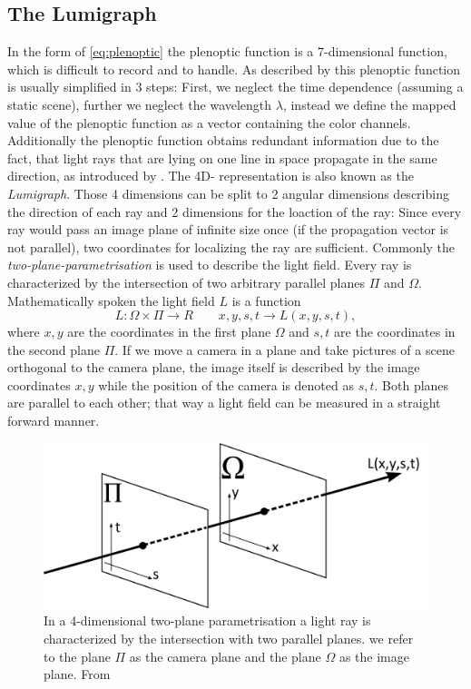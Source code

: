 \documentclass  [
  paper    = a4,
  BCOR     = 10mm,
  twoside,
  fontsize = 12pt,
  fleqn,
  toc      = bibnumbered,
  toc      = listofnumbered,
  numbers  = noendperiod,
  headings = normal,
  listof   = leveldown,
  version  = 3.03
]                                       {scrreprt}
\begin{document}
\subsection{The Lumigraph}
In the form of \ref{eq:plenoptic} the plenoptic function is a 7-dimensional function, which is difficult to record and to handle. As described by \cite{wu2017light} this plenoptic function is usually simplified in 3 steps: First, we neglect the time dependence (assuming a static scene), further we neglect the wavelength $\lambda$, instead we define the mapped value of the plenoptic function as a vector containing the color channels. 
Additionally the plenoptic function obtains redundant information due to the fact, that light rays that are lying on one line in space propagate in the same direction, as introduced by \cite{bolles1987epipolar}. The 4D- representation is also known as the \textit{Lumigraph}. Those 4 dimensions can be split to 2 angular dimensions describing the direction of each ray and 2 dimensions for the loaction of the ray: Since every ray would pass an image plane of infinite size once (if the propagation vector is not parallel), two coordinates for localizing the ray are sufficient. Commonly the \textit{two-plane-parametrisation} is used to describe the light field. Every ray is characterized by the intersection of two arbitrary parallel planes $\Pi$ and $\Omega$. Mathematically spoken the light field $L$ is a function
\begin{equation}\label{key}
L:\Omega\times \Pi \rightarrow \!R\qquad x,y,s,t\rightarrow L(x,y,s,t),
\end{equation}
where $x,y$ are the coordinates in the first plane $\Omega$ and $s,t$ are the coordinates in the second plane $\Pi$. If we move a camera in a plane and take pictures of a scene orthogonal to the camera plane, the image itself is described by the image coordinates $x,y$ while the position of the camera is denoted as $s,t$. Both planes are parallel to each other; that way a light field can be measured in a straight forward manner.
\begin{figure}[h]
	\centering
	\includegraphics[width=0.7\linewidth]{images/twoplane_param}
	\caption[Two-plane parametrisation]{In a 4-dimensional two-plane parametrisation a light ray is characterized by the intersection with two parallel planes. we refer to the plane  $\Pi$ as the camera plane and the plane $\Omega$ as the image plane. From \cite{Xu:12}}
	\label{fig:twoplaneparam}
\end{figure}
\end{document}
